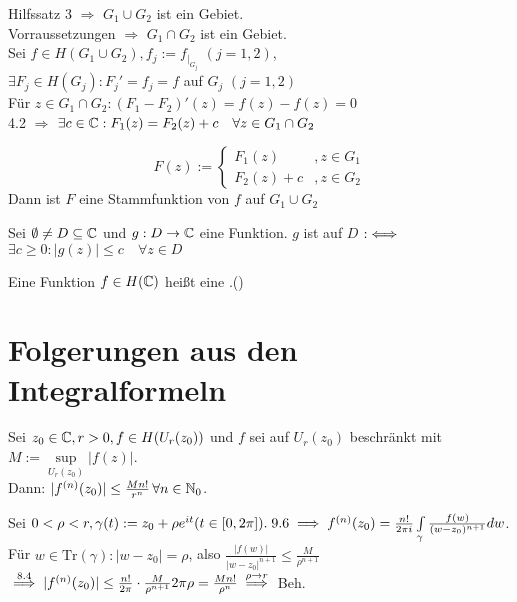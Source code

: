 \documentclass[a4paper,twoside,DIV15,BCOR12mm]{scrbook}
\def\gdw{\equizu}
\def\Tr{\text{Tr}}
\def\wegint{\ensuremath{\int\limits_\gamma}}
\def\gdw{\equizu}
\begin{document}
\begin{beweis}
Hilfssatz 3 $\Rightarrow$ $G_1 \cup G_2$ ist ein Gebiet. \\
Vorraussetzungen $\Rightarrow$ $G_1 \cap G_2$ ist ein Gebiet. \\
Sei $f \in H(G_1 \cup G_2), f_j := f_{|_{G_j}}$ $( j = 1,2)$, \\ 
$\exists F_j \in H(G_j): F_j ' = f_j = f$ auf $G_j$ $(j=1,2)$ \\
Für $z \in G_1 \cap G_2: (F_1 - F_2)'(z) = f(z) - f(z) = 0$ \\
4.2 $\Rightarrow$ $\exists c \in \mathbb{C}: F_1(z)=F_2(z) + c \quad \forall z \in G_1
\cap G_2$

\[ F(z) := \begin{cases}
				F_1(z) &, z \in G_1 \\
				F_2(z)+c &, z \in G_2
		   \end{cases} \] 
Dann ist $F$ eine Stammfunktion von $f$ auf $G_1 \cup G_2$
\end{beweis}

\begin{definition}
Sei $\emptyset \neq D \subseteq \mathbb{C}$ und $g: D \to \mathbb{C}$ eine Funktion. 
$g$ ist auf $D$  $:\gdw$ $\exists c \geq 0 : |g(z)| \leq c
\quad \forall z \in D$
\end{definition}
\begin{definition}
Eine Funktion $f \in H(\mathbb{C})$ heißt eine .()
\end{definition}


\chapter{Folgerungen aus den Integralformeln}

\begin{satz}
Sei $z_0 \in \mathbb{C}, r>0, f \in H(U_r(z_0))$ und $f$ sei auf $U_r(z_0)$ beschränkt mit $M := \sup\limits _{U_r(z_0)} |f(z)|$.\\
Dann: $|f^{(n)}(z_0)| \leq \frac{Mn!}{r^n} \,\forall n \in \mathbb{N} _0$.
\end{satz}

\begin{beweis}
Sei $0<\rho < r, \gamma (t) := z_0 + \rho e^{it} (t \in [0,2\pi ]).\; 9.6 \folgt f^{(n)}(z_0) = \frac{n!}{2\pi i} \wegint \frac{f(w)}{(w - z_0)^{n+1}}dw$.\\
Für $w \in \Tr (\gamma ) : |w - z_0| = \rho$, also $\frac{|f(w)|}{|w - z_0|^{n+1}} \leq \frac{M}{\rho ^ {n+1}}$ \\
$\stackrel{8.4}{\implies} |f^{(n)}(z_0)| \leq \frac{n!}{2\pi} \cdot \frac{M}{\rho^{n+1}}2\pi\rho = \frac{Mn!}{\rho ^n}\stackrel{\rho \to r}{\implies}$ Beh.
\end{beweis}
\end{document}
